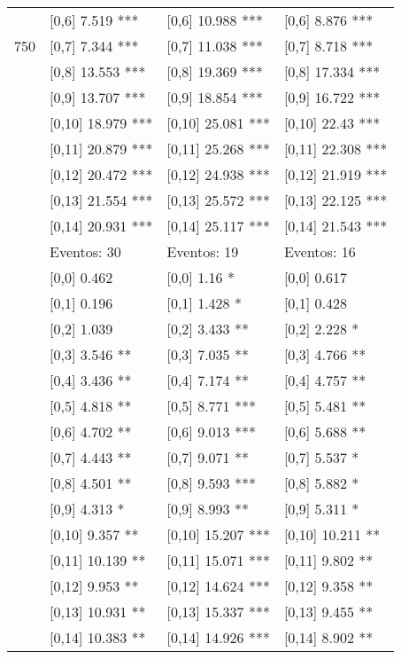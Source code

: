 \begin{table}
\begin{tabular}[t]{llll}
 & {}[0,6] 7.519 *** & {}[0,6] 10.988 *** & {}[0,6] 8.876 ***\\
750 & {}[0,7] 7.344 *** & {}[0,7] 11.038 *** & {}[0,7] 8.718 ***\\
\addlinespace
 & {}[0,8] 13.553 *** & {}[0,8] 19.369 *** & {}[0,8] 17.334 ***\\
 & {}[0,9] 13.707 *** & {}[0,9] 18.854 *** & {}[0,9] 16.722 ***\\
 & {}[0,10] 18.979 *** & {}[0,10] 25.081 *** & {}[0,10] 22.43 ***\\
 & {}[0,11] 20.879 *** & {}[0,11] 25.268 *** & {}[0,11] 22.308 ***\\
 & {}[0,12] 20.472 *** & {}[0,12] 24.938 *** & {}[0,12] 21.919 ***\\
\addlinespace
 & {}[0,13] 21.554 *** & {}[0,13] 25.572 *** & {}[0,13] 22.125 ***\\
 & {}[0,14] 20.931 *** & {}[0,14] 25.117 *** & {}[0,14] 21.543 ***\\
 & Eventos:  30 & Eventos:  19 & Eventos:  16\\
 & {}[0,0] 0.462 & {}[0,0] 1.16 * & {}[0,0] 0.617\\
 & {}[0,1] 0.196 & {}[0,1] 1.428 * & {}[0,1] 0.428\\
\addlinespace
 & {}[0,2] 1.039 & {}[0,2] 3.433 ** & {}[0,2] 2.228 *\\
 & {}[0,3] 3.546 ** & {}[0,3] 7.035 ** & {}[0,3] 4.766 **\\
 & {}[0,4] 3.436 ** & {}[0,4] 7.174 ** & {}[0,4] 4.757 **\\
 & {}[0,5] 4.818 ** & {}[0,5] 8.771 *** & {}[0,5] 5.481 **\\
 & {}[0,6] 4.702 ** & {}[0,6] 9.013 *** & {}[0,6] 5.688 **\\
\addlinespace
1000 & {}[0,7] 4.443 ** & {}[0,7] 9.071 ** & {}[0,7] 5.537 *\\
 & {}[0,8] 4.501 ** & {}[0,8] 9.593 *** & {}[0,8] 5.882 *\\
 & {}[0,9] 4.313 * & {}[0,9] 8.993 ** & {}[0,9] 5.311 *\\
 & {}[0,10] 9.357 ** & {}[0,10] 15.207 *** & {}[0,10] 10.211 **\\
 & {}[0,11] 10.139 ** & {}[0,11] 15.071 *** & {}[0,11] 9.802 **\\
\addlinespace
 & {}[0,12] 9.953 ** & {}[0,12] 14.624 *** & {}[0,12] 9.358 **\\
 & {}[0,13] 10.931 ** & {}[0,13] 15.337 *** & {}[0,13] 9.455 **\\
 & {}[0,14] 10.383 ** & {}[0,14] 14.926 *** & {}[0,14] 8.902 **\\
\bottomrule
\end{tabular}
\end{table}
